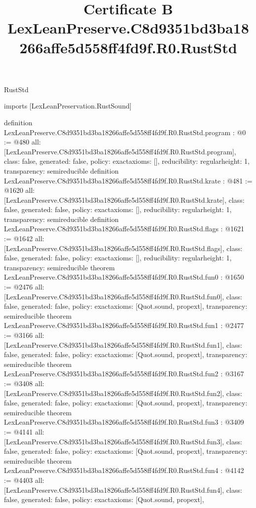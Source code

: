 \begin{lexlean}{RustStd}
\title{Certificate B LexLeanPreserve.C8d9351bd3ba18266affe5d558ff4fd9f.R0.RustStd}
\begin{coremodule}
imports [LexLeanPreservation.RustSound]

definition LexLeanPreserve.C8d9351bd3ba18266affe5d558ff4fd9f.R0.RustStd.program : @0 := @480 {
  all: [LexLeanPreserve.C8d9351bd3ba18266affe5d558ff4fd9f.R0.RustStd.program],
  class: false,
  generated: false,
  policy: exact{axioms: []},
  reducibility: regular{height: 1},
  transparency: semireducible
}
definition LexLeanPreserve.C8d9351bd3ba18266affe5d558ff4fd9f.R0.RustStd.krate : @481 := @1620 {
  all: [LexLeanPreserve.C8d9351bd3ba18266affe5d558ff4fd9f.R0.RustStd.krate],
  class: false,
  generated: false,
  policy: exact{axioms: []},
  reducibility: regular{height: 1},
  transparency: semireducible
}
definition LexLeanPreserve.C8d9351bd3ba18266affe5d558ff4fd9f.R0.RustStd.flags : @1621 := @1642 {
  all: [LexLeanPreserve.C8d9351bd3ba18266affe5d558ff4fd9f.R0.RustStd.flags],
  class: false,
  generated: false,
  policy: exact{axioms: []},
  reducibility: regular{height: 1},
  transparency: semireducible
}
theorem LexLeanPreserve.C8d9351bd3ba18266affe5d558ff4fd9f.R0.RustStd.fun0 : @1650 := @2476 {
  all: [LexLeanPreserve.C8d9351bd3ba18266affe5d558ff4fd9f.R0.RustStd.fun0],
  class: false,
  generated: false,
  policy: exact{axioms: [Quot.sound, propext]},
  transparency: semireducible
}
theorem LexLeanPreserve.C8d9351bd3ba18266affe5d558ff4fd9f.R0.RustStd.fun1 : @2477 := @3166 {
  all: [LexLeanPreserve.C8d9351bd3ba18266affe5d558ff4fd9f.R0.RustStd.fun1],
  class: false,
  generated: false,
  policy: exact{axioms: [Quot.sound, propext]},
  transparency: semireducible
}
theorem LexLeanPreserve.C8d9351bd3ba18266affe5d558ff4fd9f.R0.RustStd.fun2 : @3167 := @3408 {
  all: [LexLeanPreserve.C8d9351bd3ba18266affe5d558ff4fd9f.R0.RustStd.fun2],
  class: false,
  generated: false,
  policy: exact{axioms: [Quot.sound, propext]},
  transparency: semireducible
}
theorem LexLeanPreserve.C8d9351bd3ba18266affe5d558ff4fd9f.R0.RustStd.fun3 : @3409 := @4141 {
  all: [LexLeanPreserve.C8d9351bd3ba18266affe5d558ff4fd9f.R0.RustStd.fun3],
  class: false,
  generated: false,
  policy: exact{axioms: [Quot.sound, propext]},
  transparency: semireducible
}
theorem LexLeanPreserve.C8d9351bd3ba18266affe5d558ff4fd9f.R0.RustStd.fun4 : @4142 := @4403 {
  all: [LexLeanPreserve.C8d9351bd3ba18266affe5d558ff4fd9f.R0.RustStd.fun4],
  class: false,
  generated: false,
  policy: exact{axioms: [Quot.sound, propext]},
}
\end{coremodule}
\end{lexlean}
